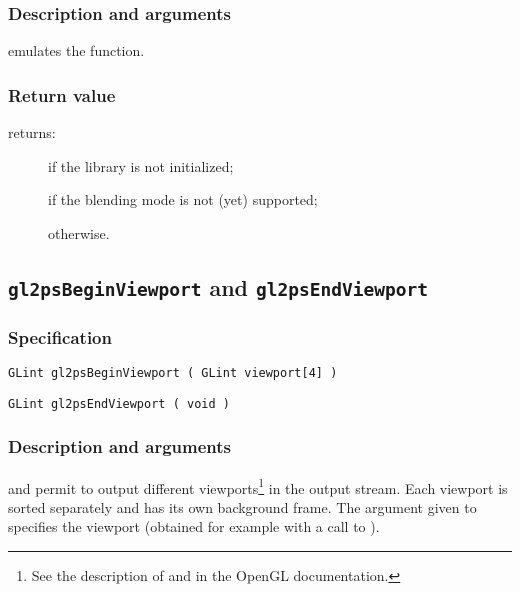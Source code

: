 \subsubsection{Description and arguments}

 emulates the  function.

\subsubsection{Return value}

\noindent{} returns:
\begin{description}
\item[] if the library is not initialized;
\item[] if the blending mode is not (yet) supported;
\item[] otherwise.
\end{description}


\subsection{\texttt{gl2psBeginViewport} and \texttt{gl2psEndViewport}}
\label{sec:gl2psBeginViewport}

\subsubsection{Specification}

\begin{verbatim}
GLint gl2psBeginViewport ( GLint viewport[4] )
\end{verbatim}

\begin{verbatim}
GLint gl2psEndViewport ( void )
\end{verbatim}

\subsubsection{Description and arguments}

 and  permit to output different
viewports\footnote{See the description of  and 
in the OpenGL documentation.} in the output stream. Each viewport is sorted
separately and has its own background frame. The argument given to
 specifies the viewport (obtained for example with a
call to ).

